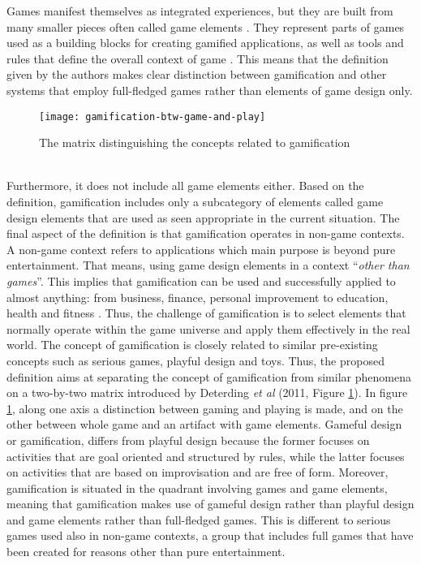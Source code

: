 Games manifest themselves as integrated experiences, but they are built from many smaller pieces often called game elements \cite{werbach2012win}. They represent parts of games used as a building blocks for creating gamified applications, as well as tools and rules that define the overall context of game \cite{gamDesElem}. This means that the definition given by the authors makes clear distinction between gamification and other systems that employ full-fledged games rather than elements of game design only.\\
\begin{figure}[h]
    \centering
    \texttt{[image: gamification-btw-game-and-play]}
    \caption{The matrix distinguishing the concepts related to gamification}
    \label{fig:mesh1}
\end{figure}\\
Furthermore, it does not include all game elements either. Based on the definition, gamification includes only a subcategory of elements called game design elements that are used as seen appropriate in the current situation. The final aspect of the definition is that gamification operates in non-game contexts. A non-game context refers to applications which main purpose is beyond pure entertainment. That means, using game design elements in a context ``\textit{other than games}''. This implies that gamification can be used and successfully applied to almost anything: from business, finance, personal improvement to education, health and fitness \cite{deterding2011game}. Thus, the challenge of gamification is to select elements that normally operate within the game universe and apply them effectively in the real world.
The concept of gamification is closely related to similar pre-existing concepts such as serious games, playful design and toys. Thus, the proposed definition aims at separating the concept of gamification from similar phenomena on a two-by-two matrix introduced by Deterding \textit{et al} (2011, Figure \ref{fig:mesh1}). 
In figure \ref{fig:mesh1}, along one axis a distinction between gaming and playing is made, and on the other between whole game and an artifact with game elements. Gameful design or gamification, differs from playful design because the former focuses on activities that are goal oriented and structured by rules, while the latter focuses on activities that are based on improvisation and are free of form. Moreover, gamification is situated in the quadrant involving games and game elements, meaning that gamification makes use of gameful design rather than playful design and game elements rather than full-fledged games. This is different to serious games used also in non-game contexts, a group that includes full games that have been created for reasons other than pure entertainment. 
